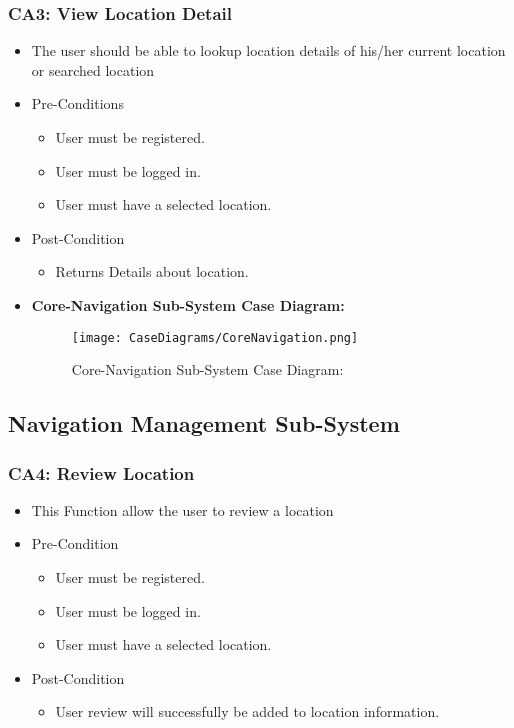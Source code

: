\documentclass[12pt,a4paper]{article}
\begin{document}
		\subsubsection{CA3: View Location Detail}
			\begin{itemize}
				\item The user should be able to lookup location details of his/her current location or searched location
				\item Pre-Conditions
					\begin{itemize}
						\item User must be registered.
						\item User must be logged in.
						\item User must have a selected location.
					\end{itemize}
				\item Post-Condition
					\begin{itemize}
						\item Returns Details about location.
					\end{itemize}
				\item \textbf{Core-Navigation Sub-System Case Diagram:}
					\begin{figure}[H]
						\texttt{[image: CaseDiagrams/CoreNavigation.png]}
						\caption{Core-Navigation Sub-System Case Diagram:}
					\end{figure}
			\end{itemize}
	\subsection{Navigation Management Sub-System}
		\subsubsection{CA4: Review Location}
			\begin{itemize}
				\item This Function allow the user to review a location
				\item Pre-Condition
					\begin{itemize}
						\item User must be registered.
						\item User must be logged in.
						\item User must have a selected location.
					\end{itemize}
				\item Post-Condition
					\begin{itemize}
						\item User review will successfully be added to location information.
					\end{itemize}

			\end{itemize}
\end{document}
